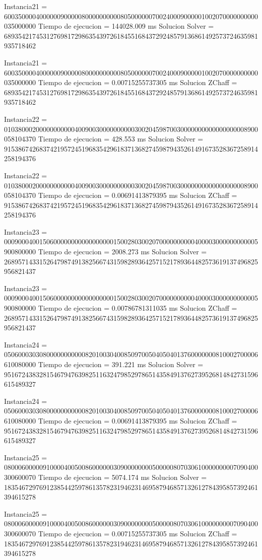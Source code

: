 Instancia21 = 600350000400000090000080000000000805000000700240009000001002070000000000035000000
Tiempo de ejecucion = 144028.009 ms
Solucion Solver = 689354217453127698172986354397261845516843729248579136861492573724635981935718462

Instancia21 = 600350000400000090000080000000000805000000700240009000001002070000000000035000000
Tiempo de ejecucion = 0.00715255737305 ms
Solucion ZChaff = 689354217453127698172986354397261845516843729248579136861492573724635981935718462

Instancia22 = 010380002000000000004009003000000000030020459870030000000000000000008900058104370
Tiempo de ejecucion = 428.553 ms
Solucion Solver = 915386742683742195724519683542961837136827459879435261491673528367258914258194376

Instancia22 = 010380002000000000004009003000000000030020459870030000000000000000008900058104370
Tiempo de ejecucion = 0.00691413879395 ms
Solucion ZChaff = 915386742683742195724519683542961837136827459879435261491673528367258914258194376

Instancia23 = 000900040015060000000000000000015002803002070000000000400003000000000005900800000
Tiempo de ejecucion = 2008.273 ms
Solucion Solver = 268957143315264798749138256674315982893642571521789364482573619137496825956821437

Instancia23 = 000900040015060000000000000000015002803002070000000000400003000000000005900800000
Tiempo de ejecucion = 0.00786781311035 ms
Solucion ZChaff = 268957143315264798749138256674315982893642571521789364482573619137496825956821437

Instancia24 = 050600030308000000000008201003040085097005040504013760000000810002700006610080000
Tiempo de ejecucion = 391.221 ms
Solucion Solver = 951672438328154679476398251163247985297865143584913762739526814842731596615489327

Instancia24 = 050600030308000000000008201003040085097005040504013760000000810002700006610080000
Tiempo de ejecucion = 0.00691413879395 ms
Solucion ZChaff = 951672438328154679476398251163247985297865143584913762739526814842731596615489327

Instancia25 = 080006000009100004005008600000030900000000500000807030610000000007090400300600070
Tiempo de ejecucion = 5074.174 ms
Solucion Solver = 183546729769123854425978613578231946231469587946857132612784395857392461394615278

Instancia25 = 080006000009100004005008600000030900000000500000807030610000000007090400300600070
Tiempo de ejecucion = 0.00715255737305 ms
Solucion ZChaff = 183546729769123854425978613578231946231469587946857132612784395857392461394615278

